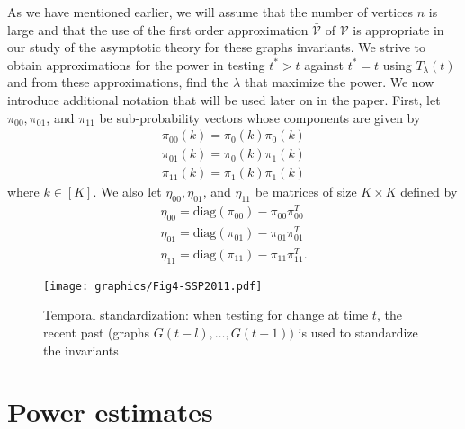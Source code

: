 \documentclass[10pt,journal,compsoc]{IEEEtran}
\theoremstyle{definition}
\begin{document}
As we have mentioned earlier, we will assume that the number of
vertices $n$ is large and that the use of the first order
approximation $\bar{\mathscr{V}}$ of $\mathscr{V}$ is appropriate in
our study of the asymptotic theory for these graphs invariants. We
strive to obtain approximations for the power in testing $t^{*} > t$
against $t^{*} = t$ using $T_{\lambda}(t)$ and from these
approximations, find the $\lambda$ that maximize the power. We now
introduce additional notation that will be used later on in the
paper. First, let $\pi_{00}, \pi_{01}$, and $\pi_{11}$ be
sub-probability vectors whose components are given by
\begin{gather*}
  \pi_{00}(k) = \pi_{0}(k) \pi_{0}(k) \\
  \pi_{01}(k) = \pi_{0}(k) \pi_{1}(k) \\
  \pi_{11}(k) = \pi_{1}(k) \pi_{1}(k)
\end{gather*}
where $k \in [K]$. We also let $\eta_{00}, \eta_{01}$, and
$\eta_{11}$ be matrices of size $K \times K$ defined by 
\begin{gather*}
  \eta_{00} = \mathrm{diag}(\pi_{00}) - \pi_{00} \pi_{00}^{T} \\
  \eta_{01} = \mathrm{diag}(\pi_{01}) - \pi_{01} \pi_{01}^{T} \\
  \eta_{11} = \mathrm{diag}(\pi_{11}) - \pi_{11} \pi_{11}^{T}.
\end{gather*}
\begin{figure}[htbp]
  \centering
  \texttt{[image: graphics/Fig4-SSP2011.pdf]}
  \caption{Temporal standardization: when testing for change at time
    $t$, the recent past (graphs $G(t - l), \dots, G(t-1))$ is used to
    standardize the invariants}
  \label{fig:temporal}
\end{figure}
\section{Power estimates}
\end{document}
